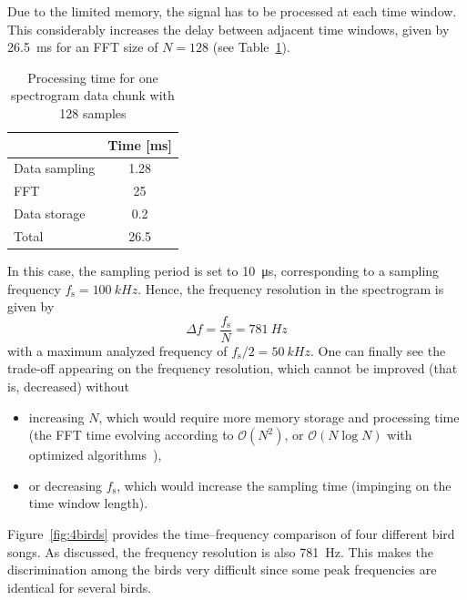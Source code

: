 \documentclass{EPL-master-thesis-covers-EN}
\newcommand{\te}[1]{\textrm{#1}}
\begin{document}
Due to the limited memory, the signal has to be processed at each time window. This considerably increases the delay between adjacent time windows, given by \SI{26.5}{ms} for an FFT size of $N = 128$ (see Table~\ref{tab:spec_data_proc}).

\begin{table}[H]
\centering
\begin{tabular}{lc}
\toprule
                     & Time [\si{ms}] \\ \midrule
 Data sampling       & 1.28           \\
 FFT                 & 25             \\
 Data storage        & 0.2            \\ \midrule
 Total               & 26.5           \\ \bottomrule
\end{tabular}
\caption{Processing time for one spectrogram data chunk with 128 samples}
\label{tab:spec_data_proc}
\end{table}

In this case, the sampling period is set to \SI{10}{\micro s}, corresponding to a sampling frequency $f_\te{s} = \SI{100}{kHz}$. Hence, the frequency resolution in the spectrogram is given by
\[
 \Delta f = \frac{f_\te{s}}{N} = \SI{781}{Hz}
\]
with a maximum analyzed frequency of $f_\te{s}/2 = \SI{50}{kHz}$. One can finally see the trade-off appearing on the frequency resolution, which cannot be improved (that is, decreased) without 
\begin{itemize}
 \item increasing $N$, which would require more memory storage and processing time (the FFT time evolving according to $\mathcal{O}(N^2)$, or $\mathcal{O}(N \log N)$ with optimized algorithms~\cite{QIU1999159}),
 \item or decreasing $f_\te{s}$, which would increase the sampling time (impinging on the time window length).
\end{itemize}

Figure~\ref{fig:4birds} provides the time--frequency comparison of four different bird songs. As discussed, the frequency resolution is also \SI{781}{Hz}. This makes the discrimination among the birds very difficult since some peak frequencies are identical for several birds.
\end{document}
